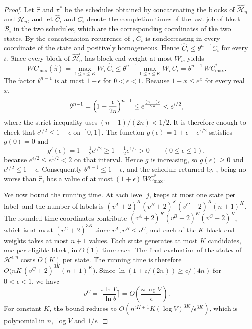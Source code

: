 \documentclass[12pt]{article}
\begin{document}
\begin{sloppypar}
\begin{proof}
            Let $\hat\pi$ and $\pi^{*}$ be the schedules obtained by concatenating the blocks of
            $\hat{\mathscr{H}}^{\epsilon}_{n}$ and $\mathscr{H}_{n}$, and let $\hat C_i$ and $C_i$ denote the
            completion times of the last job of block $\mathcal{B}_i$ in the two schedules, which are the
            corresponding coordinates of the two states. By the concatenation
            recurrence of , $C_i$ is nondecreasing in every coordinate
            of the state and positively homogeneous. Hence $\hat C_i\le\theta^{n-1}C_i$ for
            every $i$. Since every block of $\hat{\mathscr{H}}^{\epsilon}_{n}$ has block-end weight at most
            $W_i$,  yields
            \[
            W C_{\max}(\hat\pi)
            =\max_{1\le i\le K}W_i\,\hat C_i
            \le \theta^{n-1}\max_{1\le i\le K}W_i\,C_i
            =\theta^{n-1}\,W C_{\max}^{*}.
            \]
            The factor $\theta^{n-1}$ is at most $1+\epsilon$ for $0<\epsilon<1$. Because $1+x\le e^{x}$ for
            every real $x$,
            \[
            \theta^{n-1}=\Bigl(1+\frac{\epsilon}{2n}\Bigr)^{n-1}
            \le e^{\frac{(n-1)\epsilon}{2n}}
            <e^{\epsilon/2},
            \]
            where the strict inequality uses $(n-1)/(2n)<1/2$. It is therefore enough to check that
            $e^{\epsilon/2}\le1+\epsilon$ on $[0,1]$. The function $g(\epsilon)=1+\epsilon-e^{\epsilon/2}$
            satisfies $g(0)=0$ and
            \[
            g'(\epsilon)=1-\tfrac12 e^{\epsilon/2}\ge 1-\tfrac12 e^{1/2}>0
            \qquad(0\le\epsilon\le1),
            \]
            because $e^{\epsilon/2}\le e^{1/2}<2$ on that interval. Hence $g$ is increasing, so
            $g(\epsilon)\ge0$ and $e^{\epsilon/2}\le1+\epsilon$. Consequently $\theta^{n-1}\le1+\epsilon$, and
            the schedule returned by , being no worse than $\hat\pi$, has a value of
            at most $(1+\epsilon)\,W C_{\max}^{*}$.
            
            We now bound the running time. At each level $j$,  keeps at most one state
            per label, and the number of labels is $(v^{A}+2)^K(v^{B}+2)^K(v^{C}+2)^K(n+1)^K$. The rounded time
            coordinates contribute $(v^{A}+2)^K(v^{B}+2)^K(v^{C}+2)^K$, which is at most $(v^{C}+2)^{3K}$ since
            $v^{A},v^{B}\le v^{C}$, and each of the $K$ block-end weights takes at most $n+1$ values. Each
            state generates at most $K$ candidates, one per eligible block, in $O(1)$ time each. The final
            evaluation of the states of $\mathscr{H}^{\epsilon,n}$ costs $O(K)$ per state. The running time is
            therefore $O\bigl(nK\,(v^{C}+2)^{3K}(n+1)^{K}\bigr)$. Since
            $\ln(1+\epsilon/(2n))\ge\epsilon/(4n)$ for $0<\epsilon<1$, we have
            \[
            v^{C}=\Big\lceil\frac{\ln V}{\ln\theta}\Big\rceil
            =O\!\left(\frac{n\log V}{\epsilon}\right).
            \]
            For constant $K$, the bound reduces to
            $O(n^{4K+1}K(\log V)^{3K}/\epsilon^{3K})$, which is polynomial in $n$, $\log V$ and $1/\epsilon$.
        \end{proof}
        

\end{sloppypar}
\end{document}
